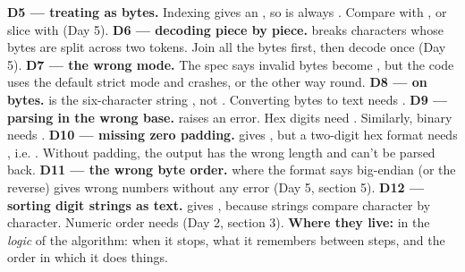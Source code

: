 \documentclass[10pt,a4paper]{article}
\begin{document}
\textbf{D5 — treating  as bytes.} Indexing  gives an , so  is always . Compare with , or slice with  (Day 5).
\textbf{D6 — decoding piece by piece.}  breaks characters whose bytes are split across two tokens. Join all the bytes first, then decode once (Day 5).
\textbf{D7 — the wrong  mode.} The spec says invalid bytes become , but the code uses the default strict mode and crashes, or the other way round.
\textbf{D8 —  on bytes.}  is the six-character string , not . Converting bytes to text needs .
\textbf{D9 — parsing in the wrong base.}  raises an error. Hex digits need . Similarly, binary needs .
\textbf{D10 — missing zero padding.}  gives , but a two-digit hex format needs , i.e. . Without padding, the output has the wrong length and can’t be parsed back.
\textbf{D11 — the wrong byte order.}  where the format says big-endian (or the reverse) gives wrong numbers without any error (Day 5, section 5).
\textbf{D12 — sorting digit strings as text.}  gives \code{[\textquotedbl{}10\textquotedbl{},\allowbreak{}\ \textquotedbl{}9\textquotedbl{}]}, because strings compare character by character. Numeric order needs  (Day 2, section 3).
\textbf{Where they live:} in the \emph{logic} of the algorithm: when it stops, what it remembers between steps, and the order in which it does things.
\end{document}
